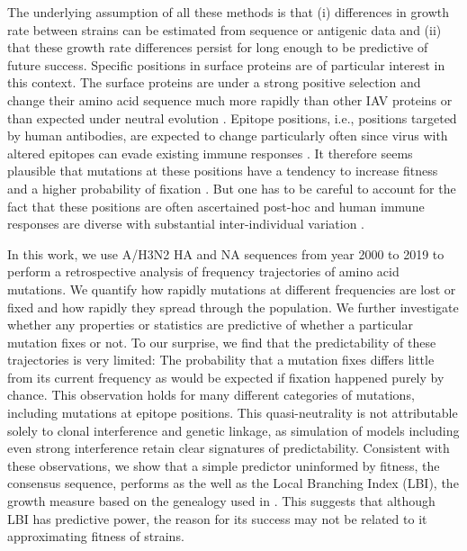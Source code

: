 \documentclass[reprint,amsmath,amssymb,superscriptaddress,showpacs,pre]{revtex4-1}
\begin{document}
	The underlying assumption of all these methods is that (i) differences in growth rate between strains can be estimated from sequence or antigenic data and (ii) that these growth rate differences persist for long enough to be predictive of future success. 
	Specific positions in surface proteins are of particular interest in this context.
	The surface proteins are under a strong positive selection and change their amino acid sequence much more rapidly than other IAV proteins or than expected under neutral evolution \citep{bhatt_genomic_2011,strelkowa_clonal_2012}. 
	Epitope positions, i.e., positions targeted by human antibodies, are expected to change particularly often since virus with altered epitopes can evade existing immune responses \citep{Koel976,wolf_long_2006,Shih6283}.
    It therefore seems plausible that mutations at these positions have a tendency to increase fitness and a higher probability of fixation \citep{strelkowa_clonal_2012}. 
    But one has to be careful to account for the fact that these positions are often ascertained post-hoc \citep{Shih6283} and human immune responses are diverse with substantial inter-individual variation
    \citep{lee_mapping_2019}.
	
	In this work, we use A/H3N2 HA and NA sequences from year 2000 to 2019 to perform a retrospective analysis of frequency trajectories of amino acid mutations. 
	We quantify how rapidly mutations at different frequencies are lost or fixed and how rapidly they spread through the population.
	We further investigate whether any properties or statistics are predictive of whether a particular mutation fixes or not. 
	To our surprise, we find that the predictability of these trajectories is very limited: The probability that a mutation fixes differs little from its current frequency as would be expected if fixation happened purely by chance.
	This observation holds for many different categories of mutations, including mutations at epitope positions. 
	This quasi-neutrality is not attributable solely to clonal interference and genetic linkage, as simulation of models including even strong interference retain clear signatures of predictability. 
	Consistent with these observations, we show that a simple predictor uninformed by fitness, the consensus sequence, performs as the well as the Local Branching Index (LBI), the growth measure based on the genealogy used in \cite{neher_predicting_2014}. 
	This suggests that although LBI has predictive power, the reason for its success may not be related to it approximating fitness of strains.  
\end{document}
